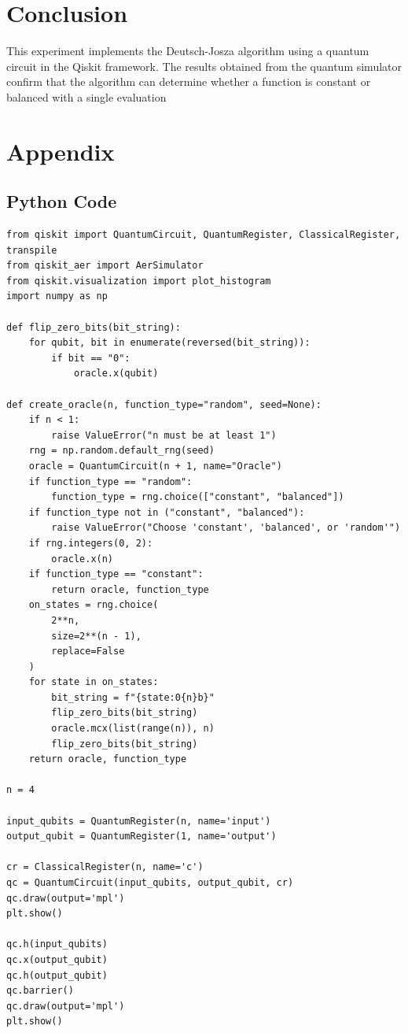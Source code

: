 \documentclass[12pt]{article}
\begin{document}
\section{Conclusion}
This experiment implements the Deutsch-Josza algorithm using a quantum circuit in the Qiskit framework. The results obtained from the quantum simulator confirm that the algorithm can determine whether a function is constant or balanced with a single evaluation

\newpage
\section{Appendix}
\subsection{Python Code}
\begin{verbatim}
from qiskit import QuantumCircuit, QuantumRegister, ClassicalRegister, transpile
from qiskit_aer import AerSimulator
from qiskit.visualization import plot_histogram
import numpy as np

def flip_zero_bits(bit_string):
    for qubit, bit in enumerate(reversed(bit_string)):
        if bit == "0":
            oracle.x(qubit)

def create_oracle(n, function_type="random", seed=None):
    if n < 1:
        raise ValueError("n must be at least 1")
    rng = np.random.default_rng(seed)
    oracle = QuantumCircuit(n + 1, name="Oracle")
    if function_type == "random":
        function_type = rng.choice(["constant", "balanced"])
    if function_type not in ("constant", "balanced"):
        raise ValueError("Choose 'constant', 'balanced', or 'random'")
    if rng.integers(0, 2):
        oracle.x(n)
    if function_type == "constant":
        return oracle, function_type
    on_states = rng.choice(
        2**n,
        size=2**(n - 1),
        replace=False
    )
    for state in on_states:
        bit_string = f"{state:0{n}b}"
        flip_zero_bits(bit_string)
        oracle.mcx(list(range(n)), n)
        flip_zero_bits(bit_string)
    return oracle, function_type

n = 4

input_qubits = QuantumRegister(n, name='input')
output_qubit = QuantumRegister(1, name='output')

cr = ClassicalRegister(n, name='c')
qc = QuantumCircuit(input_qubits, output_qubit, cr)
qc.draw(output='mpl')
plt.show()

qc.h(input_qubits)
qc.x(output_qubit)
qc.h(output_qubit)
qc.barrier()
qc.draw(output='mpl')
plt.show()


\end{verbatim}
\end{document}
